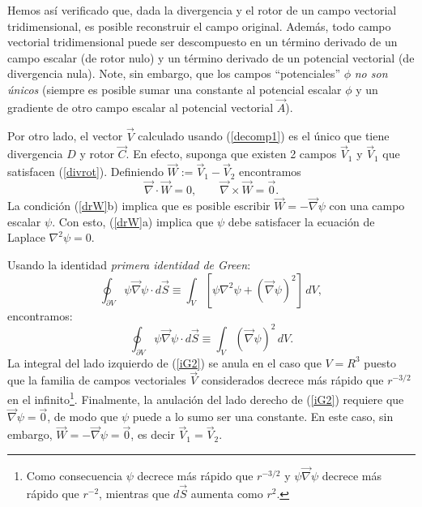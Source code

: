 Hemos así verificado que, dada la divergencia y el rotor de un campo vectorial
tridimensional, es posible reconstruir el campo original. Además,
todo campo vectorial tridimensional puede ser descompuesto en un término
derivado de un campo escalar (de rotor nulo) y un término derivado de un
potencial vectorial (de divergencia nula). Note, sin embargo, que los campos
``potenciales'' $\phi$ \textit{no son únicos} (siempre es posible sumar una
constante al potencial escalar $\phi$ y un gradiente de otro campo escalar al
potencial vectorial $\vec A$).

Por otro lado, el vector $\vec V$ calculado usando (\ref{decomp1}) es el único
que tiene divergencia $D$ y rotor $\vec C$. En efecto, suponga que existen 2
campos $\vec V_1$ y $\vec V_1$ que satisfacen (\ref{divrot}). Definiendo $\vec
W:=\vec V_1-\vec V_2$ encontramos
\begin{equation}
 \vec\nabla\cdot\vec W=0, \qquad \vec\nabla\times\vec W=\vec 0. \label{drW}
\end{equation}
La condición (\ref{drW}b) implica que es posible escribir $\vec
W=-\vec\nabla\psi$ con una campo escalar $\psi$. Con esto, (\ref{drW}a) implica
que $\psi$ debe satisfacer la ecuación de Laplace $\nabla^2\psi=0$.

Usando la identidad \textit{primera identidad de Green}:
\begin{equation}
 \oint_{\partial V}\psi \vec\nabla\psi\cdot d\vec S\equiv \int_V
\left[\psi\nabla^2\psi+(\vec\nabla\psi)^2\right]\,dV ,
\end{equation}
encontramos:
\begin{equation}
 \oint_{\partial V}\psi \vec\nabla\psi\cdot d\vec S\equiv \int_V
(\vec\nabla\psi)^2\,dV . \label{iG2}
\end{equation}
La integral del lado izquierdo de (\ref{iG2}) se anula en el caso que $V=R^3$
puesto que la familia de campos vectoriales $\vec V$ considerados decrece más
rápido que $r^{-3/2}$ en el infinito\footnote{Como consecuencia $\psi$
decrece más rápido que $r^{-3/2}$ y $\psi \vec\nabla\psi$ decrece más
rápido que $r^{-2}$, mientras que $d\vec S$ aumenta como $r^2$.}. Finalmente,
la anulación del lado derecho de  (\ref{iG2}) requiere que
$\vec\nabla\psi=\vec 0$, de modo que $\psi$ puede a lo sumo ser una constante.
En este caso, sin embargo, $\vec W=-\vec\nabla\psi=\vec 0$, es decir $\vec
V_1=\vec V_2$.


